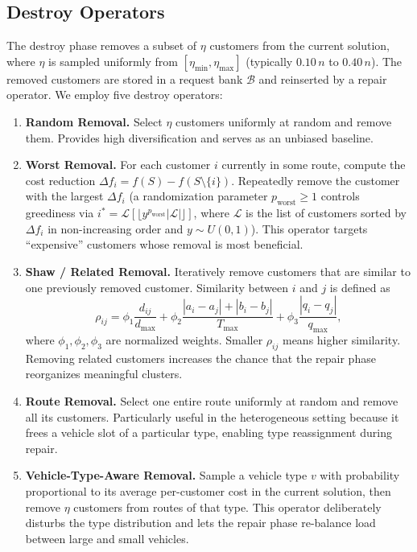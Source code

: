 \documentclass[11pt]{article}
\begin{document}
\subsection{Destroy Operators}
\label{sec:destroy}

The destroy phase removes a subset of $\eta$ customers from the current solution, where $\eta$ is sampled uniformly from $[\eta_{\min}, \eta_{\max}]$ (typically $0.10\,n$ to $0.40\,n$). The removed customers are stored in a request bank $\mathcal{B}$ and reinserted by a repair operator. We employ five destroy operators:

\begin{enumerate}[leftmargin=*]
    \item \textbf{Random Removal.} Select $\eta$ customers uniformly at random and remove them. Provides high diversification and serves as an unbiased baseline.
    \item \textbf{Worst Removal.} For each customer $i$ currently in some route, compute the cost reduction $\Delta f_i = f(S) - f(S \setminus \{i\})$. Repeatedly remove the customer with the largest $\Delta f_i$ (a randomization parameter $p_{\text{worst}} \geq 1$ controls greediness via $i^* = \mathcal{L}[\lfloor y^{p_{\text{worst}}} |\mathcal{L}| \rfloor]$, where $\mathcal{L}$ is the list of customers sorted by $\Delta f_i$ in non-increasing order and $y \sim U(0,1)$). This operator targets ``expensive'' customers whose removal is most beneficial.
    \item \textbf{Shaw / Related Removal.} Iteratively remove customers that are similar to one previously removed customer. Similarity between $i$ and $j$ is defined as
    \begin{equation}
    \rho_{ij} = \phi_1 \frac{d_{ij}}{d_{\max}} + \phi_2 \frac{|a_i - a_j| + |b_i - b_j|}{T_{\max}} + \phi_3 \frac{|q_i - q_j|}{q_{\max}},
    \end{equation}
    where $\phi_1, \phi_2, \phi_3$ are normalized weights. Smaller $\rho_{ij}$ means higher similarity. Removing related customers increases the chance that the repair phase reorganizes meaningful clusters.
    \item \textbf{Route Removal.} Select one entire route uniformly at random and remove all its customers. Particularly useful in the heterogeneous setting because it frees a vehicle slot of a particular type, enabling type reassignment during repair.
    \item \textbf{Vehicle-Type-Aware Removal.} Sample a vehicle type $v$ with probability proportional to its average per-customer cost in the current solution, then remove $\eta$ customers from routes of that type. This operator deliberately disturbs the type distribution and lets the repair phase re-balance load between large and small vehicles.
\end{enumerate}
\end{document}
